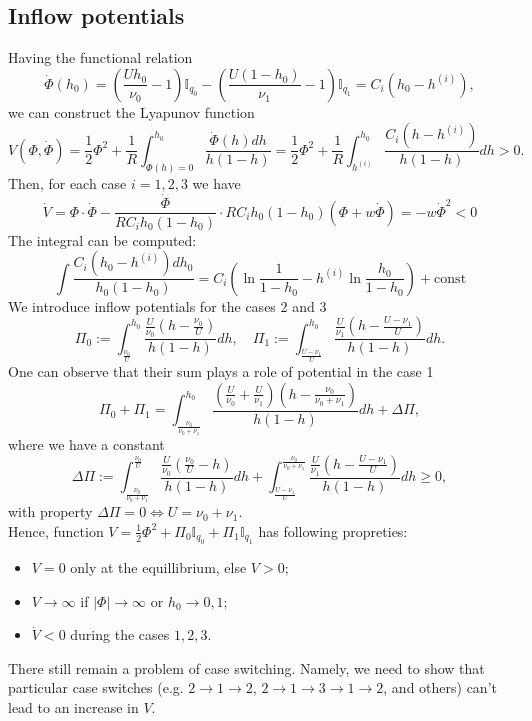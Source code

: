 \documentclass[12pt]{article}
\begin{document}
\subsection*{Inflow potentials}
Having the functional relation
$$ \dot{\Phi}(h_0) = \left(\frac{U h_0}{\nu_0} - 1 \right) \mathbb{I}_{q_0} - \left(\frac{U (1 - h_0)}{\nu_1} - 1 \right)\mathbb{I}_{q_1} = C_i(h_0 - h^{(i)}),$$
we can construct the Lyapunov function
$$ V(\Phi, \dot{\Phi}) = \frac{1}{2} \Phi^2 + \frac{1}{R} \int_{\dot{\Phi}(h) = 0}^{h_0} \frac{\dot{\Phi}(h) dh}{h(1-h)} = \frac{1}{2} \Phi^2 + \frac{1}{R} \int_{h^{(i)}}^{h_0} \frac{C_i(h - h^{(i)}) }{h(1-h)} dh> 0.$$
Then, for each case $i = 1,2,3$ we have
$$ \dot{V} = \Phi \cdot \dot{\Phi} - \frac{ \dot{\Phi }}{R C_i h_0(1-h_0)} \cdot RC_i h_0(1-h_0) (\Phi + w\dot{\Phi}) = -w \dot{\Phi}^2 < 0$$
The integral can be computed:
$$ \int \frac{ C_i(h_0 - h^{(i)}) dh_0}{h_0(1-h_0)} = C_i \left( \ln \frac{1}{1-h_0} - h^{(i)} \ln \frac{h_0}{1-h_0} \right) + \mathrm{const} $$
We introduce inflow potentials for the cases 2 and 3
$$ \Pi_0 := \int_{ \frac{\nu_0}{U} }^{h_0} \frac{\frac{U}{\nu_0}(h - \frac{\nu_0}{U})}{h(1-h)} dh, \quad  \Pi_1 := \int_{ \frac{U - \nu_1}{U} }^{h_0} \frac{\frac{U}{\nu_1}(h - \frac{U - \nu_1}{U})}{h(1-h)} dh. $$
One can observe that their sum plays a role of potential in the case 1
$$ \Pi_0 + \Pi_1 = \int_{\frac{\nu_0}{\nu_0 + \nu_1}}^{h_0} \frac{(\frac{U}{\nu_0} + \frac{U}{\nu_1})(h - \frac{\nu_0}{\nu_0 + \nu_1})}{h(1-h)} dh + \Delta \Pi, $$
where we have a constant
$$ \Delta \Pi:= \int_{\frac{\nu_0}{\nu_0 + \nu_1}}^{\frac{\nu_0}{U}} \frac{\frac{U}{\nu_0}( \frac{\nu_0}{U} - h)}{h(1-h)} dh + \int_{\frac{U - \nu_1}{U}}^{\frac{\nu_0}{\nu_0 + \nu_1}} \frac{\frac{U}{\nu_1}(h - \frac{U - \nu_1}{U})}{h(1-h)} dh \geq 0,$$
with property $\Delta \Pi =0 \Leftrightarrow U = \nu_0 + \nu_1$.
\\
Hence, function $V = \frac{1}{2} \Phi^2 + \Pi_0 \mathbb{I}_{q_0} + \Pi_1 \mathbb{I}_{q_1}$ has following propreties:
\begin{itemize}
	\item $V = 0$ only at the equillibrium, else $V > 0$;
	\item $V \to \infty$ if $|\Phi| \to \infty$ or $h_0 \to 0,1$;
	\item $ \dot{V} < 0 $ during the cases $1,2,3$.
\end{itemize}
There still remain a problem of case switching. Namely, we need to show that  particular case switches (e.g.  $2 \to 1 \to 2$, $2 \to 1 \to 3 \to 1 \to 2$, and others) can't lead to an increase in $V$.
\end{document}

